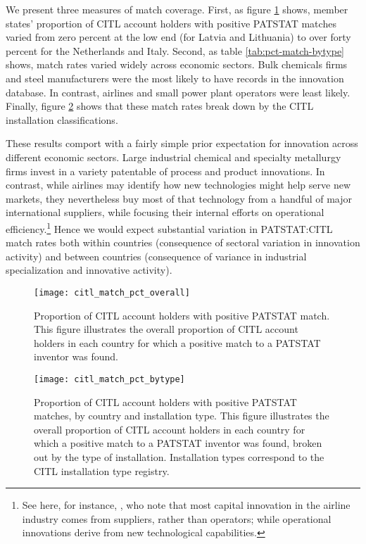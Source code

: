 \documentclass[11pt]{article}
\begin{document}
We present three measures of match coverage. First, as figure
\ref{fig:citl-match-pct} shows, member states' proportion of CITL
account holders with positive PATSTAT matches varied from zero percent
at the low end (for Latvia and Lithuania) to over forty percent for
the Netherlands and Italy. Second, as table \ref{tab:pct-match-bytype}
shows, match rates varied widely across economic sectors. Bulk
chemicals firms and steel manufacturers were the most likely to have
records in the innovation database. In contrast, airlines and small
power plant operators were least likely. Finally, figure
\ref{fig:citl-match-pct-bytype} shows that these match rates break
down by the CITL installation classifications.

These results comport with a fairly simple prior expectation
for innovation across different economic sectors. Large industrial
chemical and specialty metallurgy firms invest in a variety patentable of process
and product innovations. In contrast, while airlines may identify how
new technologies might help serve new markets, they nevertheless buy
most of that technology from a handful of major international suppliers,
while focusing their internal efforts on operational efficiency.\footnote{See here, for instance,
  \cite{brueckner2009technological}, who note that most capital
  innovation in the airline industry comes from suppliers, rather than
  operators; while operational innovations derive from new technological
  capabilities.} Hence we would expect substantial variation in
PATSTAT:CITL match rates both within countries (consequence of sectoral variation
in innovation activity) and between countries (consequence of variance
in industrial specialization and innovative activity). 

\begin{figure}[ht]
  \centering
  \texttt{[image: citl\_match\_pct\_overall]}
  \caption{Proportion of CITL account holders with positive PATSTAT match. This figure illustrates the overall proportion of CITL account holders in each country for which a positive match to a PATSTAT inventor was found.}
  \label{fig:citl-match-pct}
\end{figure}

\begin{figure}[ht]
  \centering
  \texttt{[image: citl\_match\_pct\_bytype]}
  \caption{Proportion of CITL account holders with positive PATSTAT matches, by country and installation type. This figure illustrates the overall proportion of CITL account holders in each country for which a positive match to a PATSTAT inventor was found, broken out by the type of installation. Installation types correspond to the CITL installation type registry.}
  \label{fig:citl-match-pct-bytype}
\end{figure}
\end{document}

